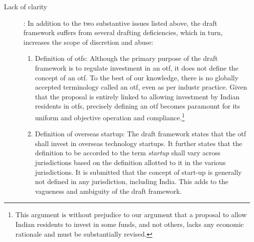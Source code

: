 \documentclass[11pt,a4paper]{article} \usepackage[parfill]{parskip}
\begin{document}
\begin{description}
\item[Lack of clarity]: In addition to the two substantive issues
  listed above, the draft framework suffers from several drafting
  deficiencies, which in turn, increases the scope of discretion and
  abuse:

  \begin{enumerate}
  \item Definition of \glspl{otf}: Although the primary purpose of the
    draft framework is to regulate investment in an \gls{otf}, it does
    not define the concept of an \gls{otf}. To the best of our
    knowledge, there is no globally accepted terminology called an
    \gls{otf}, even as per industr practice. Given that the proposal
    is entirely linked to allowing investment by Indian residents in
    \glspl{otf}, precisely defining an \gls{otf} becomes paramount for
    its uniform and objective operation and compliance.\footnote{This
      argument is without prejudice to our argument that a proposal to
      allow Indian residents to invest in some funds, and not others,
      lacks any economic rationale and must be substantially revised.}

  \item Definition of overseas startup: The draft framework states
    that the \gls{otf} shall invest in overseas technology
    startups. It further states that the definition to be accorded to
    the term \emph{startup} shall vary across jurisdictions based on
    the definition allotted to it in the various jurisdictions. It is
    submitted that the concept of start-up is generally not defined in
    any jurisdiction, including India. This adds to the vagueness and
    ambiguity of the draft framework.



\end{enumerate}
\end{description}
\end{document}
